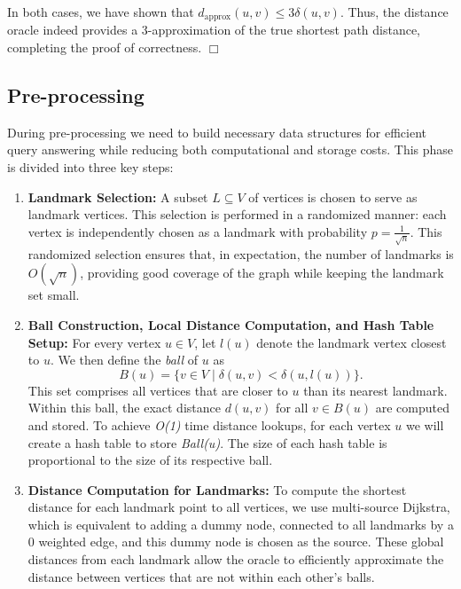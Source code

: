 \documentclass{article}
\begin{document}
\noindent In both cases, we have shown that
\(
d_{\text{approx}}(u,v) \le 3\delta(u,v).
\)
Thus, the distance oracle indeed provides a 3-approximation of the true shortest path distance, completing the proof of correctness.
\hfill \(\Box\)

\subsection{Pre-processing}
During pre-processing we need to build necessary data structures for efficient query answering while reducing both computational and storage costs. This phase is divided into three key steps:

\begin{enumerate}
    \item \textbf{Landmark Selection:}  
    A subset \(L \subseteq V\) of vertices is chosen to serve as landmark vertices. This selection is performed in a randomized manner: each vertex is independently chosen as a landmark with probability \(p = \frac{1}{\sqrt{n}}\). This randomized selection ensures that, in expectation, the number of landmarks is \(O(\sqrt{n})\), providing good coverage of the graph while keeping the landmark set small.
    
     \item \textbf{Ball Construction, Local Distance Computation, and Hash Table Setup:}  
    For every vertex \(u \in V\), let \(l(u)\) denote the landmark vertex closest to \(u\). We then define the \emph{ball} of \(u\) as
    \[
    B(u) = \{ v \in V \mid \delta(u,v) < \delta(u, l(u)) \}.
    \]
    This set comprises all vertices that are closer to \(u\) than its nearest landmark. Within this ball, the exact distance \(d(u,v)\) for all \(v \in B(u)\) are computed and stored. To achieve \textit{O(1)} time distance lookups, for each vertex \(u\) we will create a hash table to store \textit{Ball(u)}. The size of each hash table is proportional to the size of its respective ball.
    
    \item \textbf{Distance Computation for Landmarks:}  
    To compute the shortest distance for each landmark point to all vertices, we use multi-source Dijkstra, which is equivalent to adding a dummy node, connected to all landmarks by a 0 weighted edge, and this dummy node is chosen as the source. These global distances from each landmark allow the oracle to efficiently approximate the distance between vertices that are not within each other's balls.
\end{enumerate}
\end{document}
